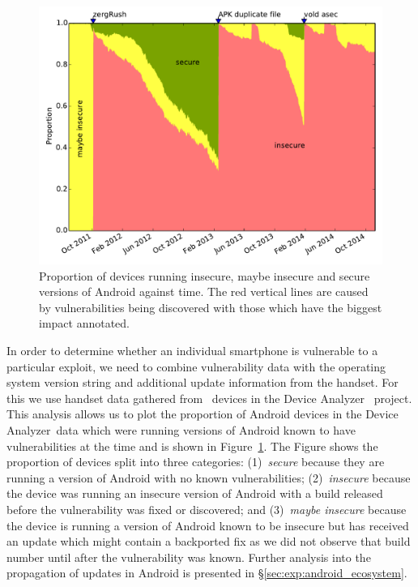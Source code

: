 \documentclass[conference,a4paper,twoside]{IEEEtran}
\newcommand{\da}{Device Analyzer}
\begin{document}
\begin{figure}[h]
\centering
\includegraphics[width=\columnwidth]{figures/proportioninsecure}
\caption{Proportion of devices running insecure, maybe insecure and secure versions of Android against time.
The red vertical lines are caused by vulnerabilities being discovered with those which have the biggest impact annotated.
}
\label{fig:proportioninsecure}
\end{figure}

In order to determine whether an individual smartphone is vulnerable to a particular exploit, we need to combine vulnerability data with the operating system version string and additional update information from the handset. 
For this we use handset data gathered from \daNumOSDevices\ devices in the \da~\cite{Wagner2013} project.
This analysis allows us to plot the proportion of Android devices in the \da\ data which were running versions of Android known to have vulnerabilities at the time and is shown in Figure~\ref{fig:proportioninsecure}.
The Figure shows the proportion of devices split into three categories: 
(1)~\emph{secure} because they are running a version of Android with no known vulnerabilities; 
(2)~\emph{insecure} because the device was running an insecure version of Android with a build released before the vulnerability was fixed or discovered; and 
(3)~\emph{maybe insecure} because the device is running a version of Android known to be insecure but has received an update which might contain a backported fix as we did not observe that build number until after the vulnerability was known.
Further analysis into the propagation of updates in Android is presented in \S\ref{sec:exp:android_ecosystem}.
\end{document}
